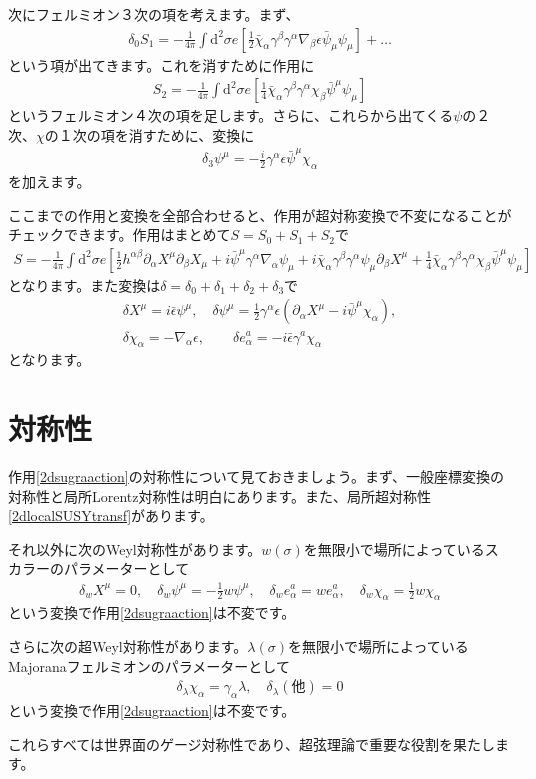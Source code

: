 \documentclass[report,paper=a4, fontsize=12pt, line_length=16cm, number_of_lines=34,dvipdfmx]{jlreq}
\numberwithin{equation}{chapter}
\numberwithin{equation}{section}
\newcommand{\del}{\partial}
\newcommand{\di}{\mathrm{d}}
\newcommand{\psib}{\bar{\psi}}
\newcommand{\chib}{\bar{\chi}}
\newcommand{\epsilonb}{\bar{\epsilon}}
\begin{document}
次にフェルミオン３次の項を考えます。まず、
\begin{align}
  \delta_{0}S_1=-\frac{1}{4\pi}\int \di^2\sigma e\left[ 
    \frac{1}{2}\chib_{\alpha}\gamma^{\beta}\gamma^{\alpha}\nabla_{\beta}\epsilon \psib_{\mu}\psi_{\mu}
   \right]+\dots
\end{align}
という項が出てきます。これを消すために作用に
\begin{align}
  S_{2}=
  -\frac{1}{4\pi}\int \di^2\sigma e\left[ 
    \frac{1}{4}\chib_{\alpha}\gamma^{\beta}\gamma^{\alpha}\chi_{\beta} \psib^{\mu}\psi_{\mu}
   \right]
\end{align}
というフェルミオン４次の項を足します。さらに、これらから出てくる$\psi$の２次、$\chi$の１次の項を消すために、変換に
\begin{align}
  \delta_{3}\psi^{\mu}=-\frac{i}{2}\gamma^{\alpha}\epsilon\psib^{\mu}\chi_{\alpha}
\end{align}
を加えます。

ここまでの作用と変換を全部合わせると、作用が超対称変換で不変になることがチェックできます。作用はまとめて$S=S_0+S_1+S_2$で
\begin{align}
  S=-\frac{1}{4\pi}\int \di^2\sigma e \left[ \frac12 h^{\alpha\beta}\del_{\alpha}X^{\mu}\del_{\beta}X_{\mu}
  +i\psib^{\mu}\gamma^{\alpha}\nabla_{\alpha}\psi_{\mu}+i
  \chib_{\alpha}\gamma^{\beta}\gamma^{\alpha}\psi_{\mu}\del_{\beta}X^{\mu}
  +\frac{1}{4}\chib_{\alpha}\gamma^{\beta}\gamma^{\alpha}\chi_{\beta} \psib^{\mu}\psi_{\mu}\right]
  \label{2dsugraaction}
\end{align}
となります。また変換は$\delta=\delta_0+\delta_1+\delta_2+\delta_3$で
\begin{align}
  \delta X^{\mu}=i\epsilonb \psi^{\mu},\quad
  \delta \psi^{\mu}=\frac12 \gamma^{\alpha}\epsilon(\del_{\alpha}X^{\mu}-i\psib^{\mu}\chi_{\alpha}),\nonumber\\
  \delta \chi_{\alpha}=-\nabla_{\alpha}\epsilon,\qquad
  \delta e^{a}_{\alpha}=-i\epsilonb \gamma^{a}\chi_{\alpha}
  \label{2dlocalSUSYtransf}
\end{align}
となります。

\section{対称性}

作用\eqref{2dsugraaction}の対称性について見ておきましょう。まず、一般座標変換の対称性と局所Lorentz対称性は明白にあります。また、局所超対称性\eqref{2dlocalSUSYtransf}があります。

それ以外に次のWeyl対称性があります。$w(\sigma)$を無限小で場所によっているスカラーのパラメーターとして
\begin{align}
  \delta_{w}X^{\mu}=0,\quad
  \delta_{w}\psi^{\mu}=-\frac12 w\psi^{\mu},\quad
  \delta_{w} e^{a}_{\alpha}=w e^{a}_{\alpha},\quad
  \delta_{w} \chi_{\alpha}=\frac12 w\chi_{\alpha}
\end{align}
という変換で作用\eqref{2dsugraaction}は不変です。

さらに次の超Weyl対称性があります。$\lambda(\sigma)$を無限小で場所によっているMajoranaフェルミオンのパラメーターとして
\begin{align}
  \delta_{\lambda}\chi_{\alpha}=\gamma_{\alpha}\lambda,\quad
  \delta_{\lambda}(\text{他})=0
\end{align}
という変換で作用\eqref{2dsugraaction}は不変です。

これらすべては世界面のゲージ対称性であり、超弦理論で重要な役割を果たします。
\end{document}
